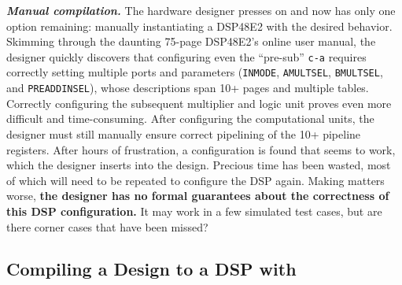 \textit{\textbf{Manual compilation.}}
The hardware designer presses on and
  now has only one option remaining:
  manually instantiating a DSP48E2
  with the desired behavior.
Skimming through the daunting 75-page DSP48E2's online user manual,
  the designer quickly discovers that
  configuring even
  the ``pre-sub'' \texttt{c-a}
  requires correctly setting 
  multiple ports and parameters
  (\texttt{INMODE}, \texttt{AMULTSEL}, \texttt{BMULTSEL}, and \texttt{PREADDINSEL}),
  whose descriptions span 10+ pages and multiple tables.
Correctly configuring the subsequent multiplier
  and logic unit proves even more difficult
  and time-consuming.
After configuring the computational units,
  the designer must still manually ensure
  correct pipelining
  of the 10+ pipeline registers.
After hours
  of frustration,
  a configuration is found that 
  seems to work, which the designer
  inserts into the design.
Precious time has been wasted,
  most of which will need to be repeated
  to configure the DSP again.
Making matters worse,
  \textbf{the designer has no formal guarantees
  about the correctness of this DSP configuration.}
It may work in a few simulated test cases,
  but are there corner cases
  that have been missed?\tighten



  
\subsection{Compiling a Design to a DSP with \lr}
\label{sec:overview-part-2}

